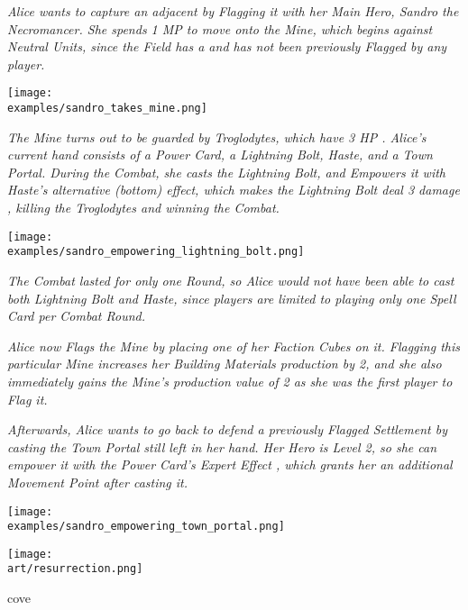 \begin{multicols*}{2}

\textit{Alice wants to capture an adjacent  by Flagging it with her Main Hero, Sandro the Necromancer.
    She spends 1 MP to move onto the Mine, which begins  against Neutral Units, since the Field has a  and has not been previously Flagged by any player.}\par

\texttt{[image: \\examples/sandro\_takes\_mine.png]}

\textit{The Mine turns out to be guarded by Troglodytes, which have 3 HP .
Alice's current hand consists of a Power Card, a Lightning Bolt, Haste, and a Town Portal.
During the Combat, she casts the Lightning Bolt, and Empowers  it with Haste's alternative (bottom) effect, which makes the Lightning Bolt deal 3 damage , killing the Troglodytes and winning the Combat.}

\texttt{[image: \\examples/sandro\_empowering\_lightning\_bolt.png]}

\columnbreak
\textit{The Combat lasted for only one Round, so Alice would not have been able to cast both Lightning Bolt and Haste, since players are limited to playing only one Spell Card per Combat Round.}\par


\textit{Alice now Flags the Mine by placing one of her Faction Cubes on it.
    Flagging this particular Mine increases her Building Materials  production by 2, and she also immediately gains the Mine's production value of 2  as she was the first player to Flag it.}\par
\textit{Afterwards, Alice wants to go back to defend a previously Flagged Settlement by casting the Town Portal still left in her hand.
    Her Hero is Level 2, so she can empower it with the Power Card's Expert Effect , which grants her an additional Movement Point after casting it.
}

\texttt{[image: \\examples/sandro\_empowering\_town\_portal.png]}

\vfill
\hspace{2em}
{\texttt{[image: \\art/resurrection.png]}}

\newpage

\begin{expansion}{cove}

\end{expansion}
\end{multicols*}
